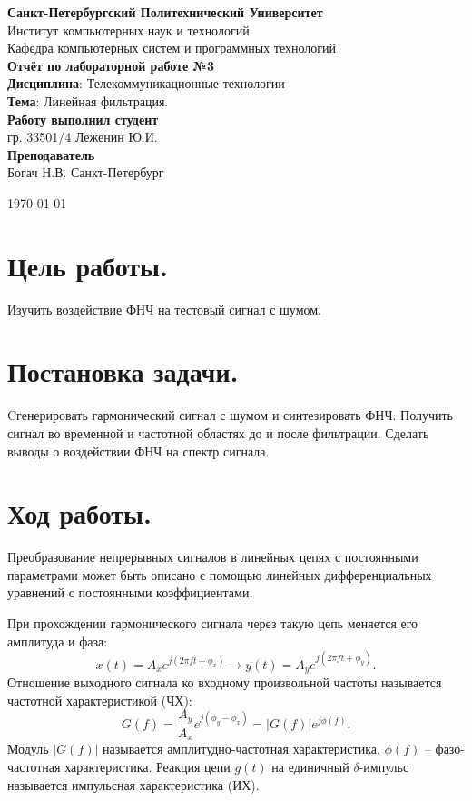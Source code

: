 \documentclass[a4paper,14pt]{extarticle}
\begin{document}
\begin{titlepage}
\centering 
{\bfseries Санкт-Петербургский Политехнический Университет} \\
Институт компьютерных наук и технологий \\
Кафедра компьютерных систем и программных технологий \\
\vspace{5cm}
{\centering \textbf{Отчёт по лабораторной работе №3} \\ 
\vspace{0.15cm}
\textbf{Дисциплина}: Телекоммуникационные технологии \\
\vspace{0.15cm}
\textbf{Тема}: Линейная фильтрация.} \\
\vspace{4cm}
\hfill {\bfseries Работу выполнил студент}  \\
\hfill гр. 33501/4 Леженин Ю.И. \\
\hfill {\bfseries Преподаватель}  \\
\hfill Богач Н.В.
\vfill
Санкт-Петербург \\
{\large \today\par}
\end{titlepage}

\section{Цель работы.}

Изучить воздействие ФНЧ на тестовый сигнал с шумом.

\section{Постановка задачи.} 

Cгенерировать гармонический сигнал с шумом
и синтезировать ФНЧ. Получить сигнал во временной и частотной
областях до и после фильтрации. Сделать выводы о воздействии
ФНЧ на спектр сигнала.

\section{Ход работы.}

Преобразование непрерывных сигналов в линейных цепях с постоянными параметрами может быть описано с помощью линейных дифференциальных уравнений с постоянными коэффициентами.

При прохождении гармонического сигнала через такую цепь меняется его амплитуда и фаза: 
\begin{equation*}
x(t) = A_x e^{j (2 \pi f t + \phi_x)} \rightarrow y(t) = A_y e^{j (2 \pi f t + \phi_y)}.
\end{equation*} 
Отношение выходного сигнала ко входному произвольной частоты называется частотной характеристикой (ЧХ):
\begin{equation*}
G(f) = \frac{A_y}{A_x} e^{j (\phi_y - \phi_x)} = |G(f)|e^{j \phi(f)}.
\end{equation*}
Модуль $|G(f)|$ называется амплитудно-частотная характеристика, $\phi(f)$ -- фазо-частотная характеристика.
Реакция цепи $g(t)$ на единичный $\delta$-импульс называется импульсная характеристика (ИХ).
\end{document}
